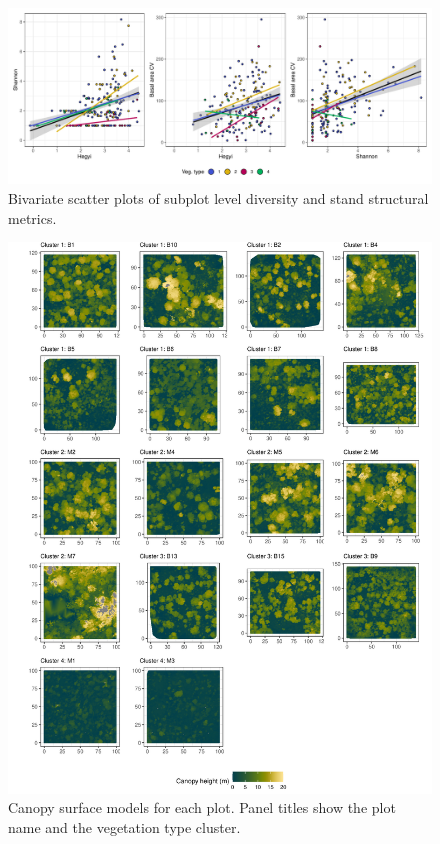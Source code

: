 \begin{refsection}
\begin{supplement}
\begin{figure}[H]
	\includegraphics[width=\linewidth]{img/pred_comp_subplot}
	\caption[Bivariate plots of subplot diversity and stand structural metrics]{Bivariate scatter plots of subplot level diversity and stand structural metrics.}
	\label{tls:pred_comp_subplot}
\end{figure}


\begin{landscape}
	
\end{landscape}

\begin{figure}
	\includegraphics[width=\linewidth]{img/veg_type_tile_all}
	\caption[Canopy surface models]{Canopy surface models for each plot. Panel titles show the plot name and the vegetation type cluster.}
	\label{tls:veg_type_tile_all}
\end{figure}

\end{supplement}

\end{refsection}

